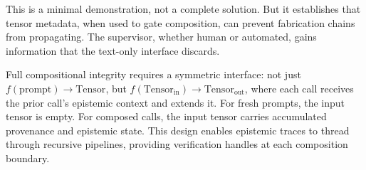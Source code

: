 This is a minimal demonstration, not a complete solution. But it establishes
that tensor metadata, when used to gate composition, can prevent fabrication
chains from propagating. The supervisor, whether human or automated, gains
information that the text-only interface discards.

Full compositional integrity requires a symmetric interface: not just
$f(\text{prompt}) \to \text{Tensor}$, but
$f(\text{Tensor}_{\text{in}}) \to \text{Tensor}_{\text{out}}$, where each call
receives the prior call's epistemic context and extends it. For fresh prompts,
the input tensor is empty. For composed calls, the input tensor carries
accumulated provenance and epistemic state. This design enables epistemic
traces to thread through recursive pipelines, providing verification handles at
each composition boundary.
